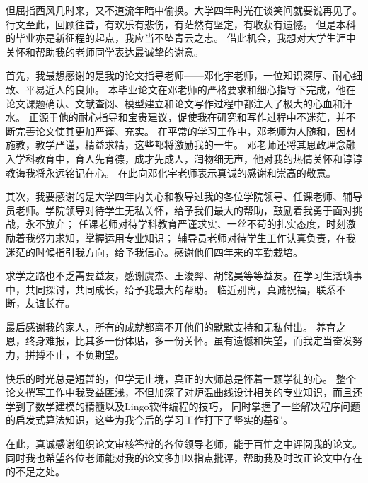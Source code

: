 \begin{acknowledgements}
    但屈指西风几时来，又不道流年暗中偷换。大学四年时光在谈笑间就要说再见了。
    行文至此，回顾往昔，有欢乐有悲伤，有茫然有坚定，有收获有遗憾。
    但是本科的毕业亦是新征程的起点，我应当不坠青云之志。
    借此机会，我想对大学生涯中关怀和帮助我的老师同学表达最诚挚的谢意。

    首先，我最想感谢的是我的论文指导老师——邓化宇老师，一位知识深厚、耐心细致、平易近人的良师。
    本毕业论文在邓老师的严格要求和细心指导下完成，他在论文课题确认、文献查阅、模型建立和论文写作过程中都注入了极大的心血和汗水。
    正源于他的耐心指导和宝贵建议，促使我在研究和写作过程中不迷茫，并不断完善论文使其更加严谨、充实。
    在平常的学习工作中，邓老师为人随和，因材施教，教学严谨，精益求精，这些都将激励我的一生。
    邓老师还将其思政理念融入学科教育中，育人先育德，成才先成人，润物细无声，他对我的热情关怀和谆谆教诲我将永远铭记在心。
    在此向邓化宇老师表示真诚的感谢和崇高的敬意。

    其次，我要感谢的是大学四年内关心和教导过我的各位学院领导、任课老师、辅导员老师。学院领导对待学生无私关怀，给予我们最大的帮助，鼓励着我勇于面对挑战，永不放弃；
    任课老师对待学科教育严谨求实、一丝不苟的扎实态度，时刻激励着我努力求知，掌握运用专业知识；
    辅导员老师对待学生工作认真负责，在我迷茫的时候指引我方向，给予我信心。感谢他们四年来的辛勤栽培。

    求学之路也不乏需要益友，感谢虞杰、王浚羿、胡铭昊等等益友。在学习生活琐事中，共同探讨，共同成长，给予我最大的帮助。
    临近别离，真诚祝福，联系不断，友谊长存。

    最后感谢我的家人，所有的成就都离不开他们的默默支持和无私付出。
    养育之恩，终身难报，比其多一份体贴，多一份关怀。虽有遗憾和失望，而我定当奋发努力，拼搏不止，不负期望。

    快乐的时光总是短暂的，但学无止境，真正的大师总是怀着一颗学徒的心。
    整个论文撰写工作中我受益匪浅，不但加深了对炉温曲线设计相关的专业知识，而且还学到了数学建模的精髓以及Lingo软件编程的技巧，
    同时掌握了一些解决程序问题的启发式算法知识，这些为我今后的学习工作打下了坚实的基础。

    在此，真诚感谢组织论文审核答辩的各位领导老师，能于百忙之中评阅我的论文。
    同时我也希望各位老师能对我的论文多加以指点批评，帮助我及时改正论文中存在的不足之处。
\end{acknowledgements}
  
